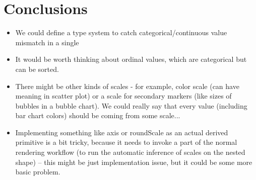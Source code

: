 \documentclass{jfp}
\newcommand{\kvd}[1]{\textnormal{\textcolor{kvdclr}{\sffamily #1}}}
\begin{document}
\section{Conclusions}
\begin{itemize}
\item We could define a type system to catch categorical/continuous value mismatch in a single %
\item It would be worth thinking about ordinal values, which are categorical but can be sorted.
\item There might be other kinds of scales - for example, color scale (can have meaning in scatter plot)
 or a scale for secondary markers (like sizes of bubbles in a bubble chart). We could really say that
 every value (including bar chart colors) should be coming from some scale...
\item Implementing something like \kvd{axis} or \kvd{roundScale} as an actual derived primitive is
 a bit tricky, because it needs to invoke a part of the normal rendering workflow (to run the
 automatic inference of scales on the nested shape) -- this might be just implementation issue,
 but it could be some more basic problem.
\end{itemize}

\cite{gcharts}
\cite{seaborn}
\cite{youdraw}
\cite{grammar}
\cite{layered}
\cite{vega-lite}
\cite{vega}
\cite{d3}
\cite{polaris}



\end{document}
